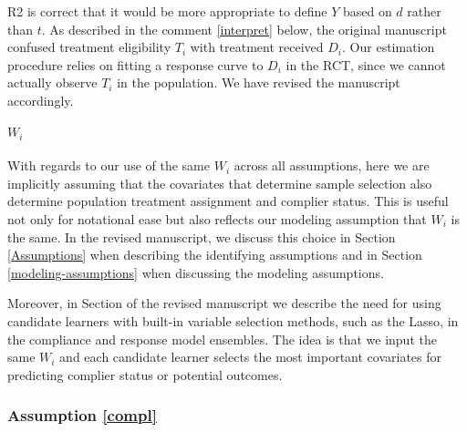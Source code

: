 \documentclass[hidelinks,12pt,letterpaper]{article}
\begin{document}
R2 is correct that it would be more appropriate to define $Y$ based on $d$ rather than $t$. As described in the comment \ref{interpret} below, the original manuscript confused treatment eligibility $T_i$ with treatment received $D_i$. Our estimation procedure relies on fitting a response curve to $D_i$ in the RCT, since we cannot actually observe $T_i$ in the population. We have revised the manuscript accordingly. 

\paragraph{$W_i$} \label{Wi}

With regards to our use of the same $W_i$ across all assumptions, here we are implicitly assuming that the covariates that determine sample selection also determine population treatment assignment and complier status. This is useful not only for notational ease but also reflects our modeling assumption that $W_i$ is the same. In the revised manuscript, we discuss this choice in Section \ref{Assumptions} when describing the identifying assumptions and in Section \ref{modeling-assumptions} when discussing the modeling assumptions. 

Moreover, in Section \label{ensemble} of the revised manuscript we describe the need for using candidate learners with built-in variable selection methods, such as the Lasso, in the compliance and response model ensembles. The idea is that we input the same $W_i$ and each candidate learner selects the most important covariates for predicting complier status or potential outcomes. 

\subsubsection{Assumption \ref{compl}}

\end{document}
